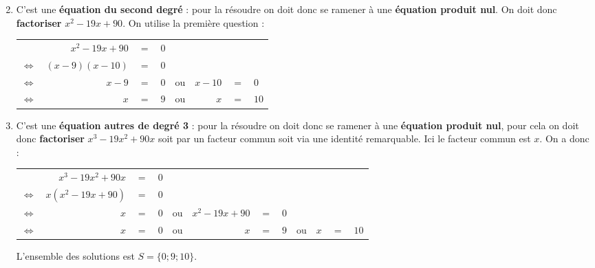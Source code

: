 \documentclass[15pt, mathserif]{beamer}
\newcommand{\ligneq}[2]{$\Longleftrightarrow$ & $#1$ & $=$ & $#2$ \\}
\newcommand{\Ligneq}[2]{ & $#1$ & $=$ & $#2$ \\}
\newenvironment{RPN}{\begin{center}\begin{tabular}{rrclcrcl}}{\end{tabular}\end{center}}
\newcommand{\lignerpn}[4]{$\Longleftrightarrow$ & $#1$ & $=$ & $#2$ & ou & $#3$ & $=$ & $#4$ \\}
\newenvironment{TRPN}{\begin{center}\begin{tabular}{rrclcrclcrcl}}{\end{tabular}\end{center}}
\newcommand{\lignetrpn}[6]{$\Longleftrightarrow$ & $#1$ & $=$ & $#2$ & ou & $#3$ & $=$ & $#4$ & ou & $#5$ & $=$ & $#6$ \\}
\begin{document}
 \begin{frame} 
 \begin{enumerate} \setcounter{enumi}{1}  
 	 \item C'est une \textbf{équation du second degré} : pour la résoudre on doit donc se ramener à une \textbf{équation produit nul}. On doit donc \textbf{factoriser} $x^2-19x+90$. On utilise la première question : 
 	 	  \begin{RPN} 
 	 	  	 \Ligneq{x^2-19x+90}{0} 
 	 	 	 \ligneq{(x-9)(x-10)}{0} 
 	 	 	 \lignerpn{x-9}{0}{x-10}{0} 
 	 	 	 \lignerpn{x}{9}{x}{10} 
 	 	  \end{RPN} 
 	 \item C'est une \textbf{équation autres de degré 3} : pour la résoudre on doit donc se ramener à une \textbf{équation produit nul}, pour cela on doit donc \textbf{factoriser} $x^3-19x^2+90x $ soit par un facteur commun soit via une identité remarquable. Ici le facteur commun est $x$. On a donc : 
 	 	 \begin{footnotesize} 
 \begin{TRPN} 
 	 	 	 \Ligneq{x^3-19x^2+90x}{0} 
 	 	 	 \ligneq{x(x^2-19x+90)}{0} 
 	 	 	 \lignerpn{x}{0}{x^2-19x+90}{0} 
 	 	 	 \lignetrpn{x}{0}{x}{9}{x}{10} 
 	 	 \end{TRPN} 
 \end{footnotesize} L'ensemble des solutions est $S=\{0;9;10\}$. 
 \end{enumerate} 
 
 \end{frame}
\end{document}
